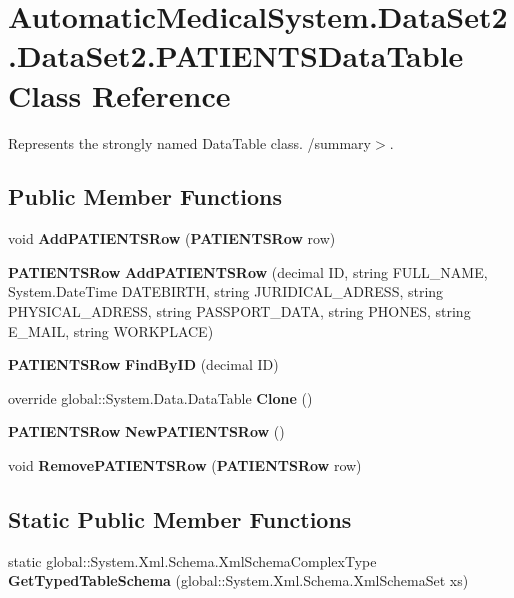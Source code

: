 \section{AutomaticMedicalSystem.DataSet2.DataSet2.PATIENTSDataTable Class Reference}
\label{class_automatic_medical_system_1_1_data_set2_1_1_p_a_t_i_e_n_t_s_data_table}
Represents the strongly named DataTable class. /summary$>$.  


\subsection*{Public Member Functions}
\begin{CompactItemize}
\item 
void \textbf{AddPATIENTSRow} ({\bf PATIENTSRow} row)\label{class_automatic_medical_system_1_1_data_set2_1_1_p_a_t_i_e_n_t_s_data_table_e706e8cb3418cc000b7515e71187edce}

\item 
{\bf PATIENTSRow} \textbf{AddPATIENTSRow} (decimal ID, string FULL\_\-NAME, System.DateTime DATEBIRTH, string JURIDICAL\_\-ADRESS, string PHYSICAL\_\-ADRESS, string PASSPORT\_\-DATA, string PHONES, string E\_\-MAIL, string WORKPLACE)\label{class_automatic_medical_system_1_1_data_set2_1_1_p_a_t_i_e_n_t_s_data_table_4979a2818884d26027bc1e10a7ff797d}

\item 
{\bf PATIENTSRow} \textbf{FindByID} (decimal ID)\label{class_automatic_medical_system_1_1_data_set2_1_1_p_a_t_i_e_n_t_s_data_table_617f948c274f3b6941ba0dce316f66a8}

\item 
override global::System.Data.DataTable \textbf{Clone} ()\label{class_automatic_medical_system_1_1_data_set2_1_1_p_a_t_i_e_n_t_s_data_table_014adb8183f7a306807df1d4b1cb98aa}

\item 
{\bf PATIENTSRow} \textbf{NewPATIENTSRow} ()\label{class_automatic_medical_system_1_1_data_set2_1_1_p_a_t_i_e_n_t_s_data_table_edeef984ed0b233c33b201d66a24cdce}

\item 
void \textbf{RemovePATIENTSRow} ({\bf PATIENTSRow} row)\label{class_automatic_medical_system_1_1_data_set2_1_1_p_a_t_i_e_n_t_s_data_table_c094bef8e13e1465e552adc01dcd04fb}

\end{CompactItemize}
\subsection*{Static Public Member Functions}
\begin{CompactItemize}
\item 
static global::System.Xml.Schema.XmlSchemaComplexType \textbf{GetTypedTableSchema} (global::System.Xml.Schema.XmlSchemaSet xs)\label{class_automatic_medical_system_1_1_data_set2_1_1_p_a_t_i_e_n_t_s_data_table_435bc6f302c781502ee441ea5772d70d}

\end{CompactItemize}
